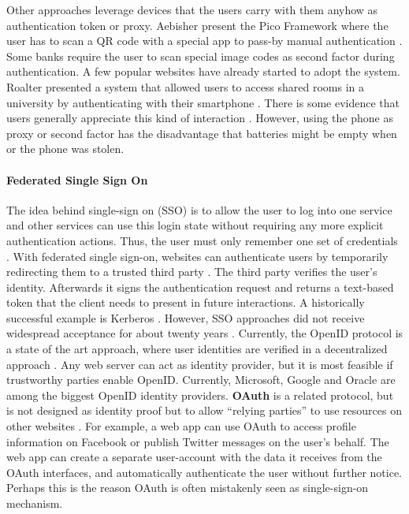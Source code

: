 	Other approaches leverage devices that the users carry with them anyhow as authentication token or proxy. Aebisher \etal present the Pico Framework where the user has to scan a QR code with a special app to pass-by manual authentication \cite{Aebischer2017PicoInTheWild}. Some banks require the user to scan special image codes as second factor during authentication. A few popular websites have already started to adopt the system. Roalter \etal presented a system that allowed users to access shared rooms in a university by authenticating with their smartphone \cite{Roalter2013SmartphoneProxy}. There is some evidence that users generally appreciate this kind of interaction \cite{Ruoti2015AuthenticationMelee}. However, using the phone as proxy or second factor has the disadvantage that batteries might be empty when or the phone was stolen. 
	
	\paragraph{Federated Single Sign On}
	The idea behind single-sign on (SSO) is to allow the user to log into one service and other services can use this login state without requiring any more explicit authentication actions. Thus, the user must only remember one set of credentials \cite{Egelman2013ProfilePassword}. With federated single sign-on, websites can authenticate users by temporarily redirecting them to a trusted third party \cite{Bonneau2012ReplacePasswords}. The third party verifies the user's identity. Afterwards it signs the authentication request and returns a text-based token that the client needs to present in future interactions. A historically successful example is Kerberos \cite{Kohl1993Kerberos}. However, SSO approaches did not receive widespread acceptance for about twenty years \cite{Sun2010BillionKeys}. Currently, the OpenID protocol is a state of the art approach, where user identities are verified in a decentralized approach \cite{Recordon2006OpenID}. Any web server can act as identity provider, but it is most feasible if trustworthy parties enable OpenID. Currently, Microsoft, Google and Oracle are among the biggest OpenID identity providers. \textbf{OAuth} is a related protocol, but is not designed as identity proof but to allow ``relying parties'' to use resources on other websites \cite{Bonneau2012ReplacePasswords}. For example, a web app can use OAuth to access profile information on Facebook or publish Twitter messages on the user's behalf. The web app can create a separate user-account with the data it receives from the OAuth interfaces, and automatically authenticate the user without further notice. Perhaps this is the reason OAuth is often mistakenly seen as single-sign-on mechanism. 
	
